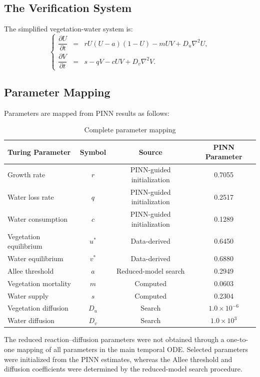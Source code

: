 \documentclass[12pt,a4paper]{article}
\begin{document}
	\subsection{The Verification System}
	
	The simplified vegetation-water system is:
	\begin{equation}
		\left\{
		\begin{array}{rcl}
			\dfrac{\partial U}{\partial t} &=& r U (U - a)(1 - U) - m U V + D_u \nabla^2 U, \\[0.4cm]
			\dfrac{\partial V}{\partial t} &=& s - q V - c U V + D_v \nabla^2 V.
		\end{array}
		\right.
	\end{equation}
	
	\subsection{Parameter Mapping}
	
	Parameters are mapped from PINN results as follows:
	
	\begin{table}[H]
		\centering
		\caption{Complete parameter mapping}
		\label{tab:mapping_supp}
		\begin{tabular}{lccc}
			\toprule
			Turing Parameter & Symbol & Source & PINN Parameter \\
			\midrule
			Growth rate & $r$ & PINN-guided initialization & 0.7055 \\
			Water loss rate & $q$ & PINN-guided initialization & 0.2517 \\
			Water consumption & $c$ & PINN-guided initialization & 0.1289 \\
			Vegetation equilibrium & $u^*$ & Data-derived & 0.6450 \\
			Water equilibrium & $v^*$ & Data-derived & 0.6880 \\
			Allee threshold & $a$ & Reduced-model search & 0.2949 \\
			Vegetation mortality & $m$ & Computed & 0.0603 \\
			Water supply & $s$ & Computed & 0.2304 \\
			Vegetation diffusion & $D_u$ & Search & $1.0\times10^{-6}$ \\
			Water diffusion & $D_v$ & Search & $1.0\times10^{3}$ \\
			\bottomrule
		\end{tabular}
	\end{table}
	The reduced reaction--diffusion parameters were not obtained through a
	one-to-one mapping of all parameters in the main temporal ODE. Selected
	parameters were initialized from the PINN estimates, whereas the Allee
	threshold and diffusion coefficients were determined by the reduced-model
	search procedure.
\end{document}
